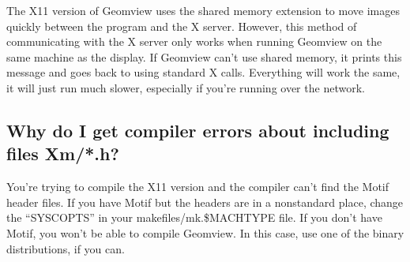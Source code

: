 \documentclass[12pt,a4paper]{article}
\begin{document}
        The X11 version of Geomview uses the shared memory extension to move
        images quickly between the program and the X server. However, this
        method of communicating with the X server only works when running
        Geomview on the same machine as the display. If Geomview can't use
        shared memory, it prints this message and goes back to using standard X
        calls. Everything will work the same, it will just run much slower,
        especially if you're running over the network.

    \subsection{Why do I get compiler errors about including files Xm/*.h?}

        You're trying to compile the X11 version and the compiler can't find the
        Motif header files. If you have Motif but the headers are in a
        nonstandard place, change the ``SYSCOPTS'' in your
        makefiles/mk.\${MACHTYPE} file. If you don't have Motif, you won't be
        able to compile Geomview. In this case, use one of the binary
        distributions, if you can.
\end{document}
